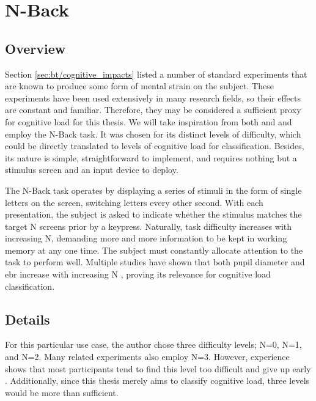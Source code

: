 \section{N-Back} \label{sec:impl/tasks}
\subsection{Overview}

Section \ref{sec:bt/cognitive_impacts} listed a number of standard experiments that are known to produce some form of mental strain on the subject. These experiments have been used extensively in many research fields, so their effects are constant and familiar. Therefore, they may be considered a sufficient proxy for cognitive load for this thesis. We will take inspiration from both \textcite{hopstaken2015} and \textcite{appel2021} and employ the N-Back task. It was chosen for its distinct levels of difficulty, which could be directly translated to levels of cognitive load for classification. Besides, its nature is simple, straightforward to implement, and requires nothing but a stimulus screen and an input device to deploy. 

The N-Back task operates by displaying a series of stimuli in the form of single letters on the screen, switching letters every other second. With each presentation, the subject is asked to indicate whether the stimulus matches the target N screens prior by a keypress. Naturally, task difficulty increases with increasing N, demanding more and more information to be kept in working memory at any one time. The subject must constantly allocate attention to the task to perform well. Multiple studies have shown that both pupil diameter and \acrshort{ebr} increase with increasing N \cite{hopstaken2015, belayachi2015, brouwer2014, niezgoda2015}, proving its relevance for cognitive load classification. 

\subsection{Details} \label{sec:impl/tasks/details}

For this particular use case, the author chose three difficulty levels; N=0, N=1, and N=2. Many related experiments also employ N=3. However, experience shows that most participants tend to find this level too difficult and give up early \cite{ayaz2007, izzetoglu2007}. Additionally, since this thesis merely aims to classify cognitive load, three levels would be more than sufficient.

